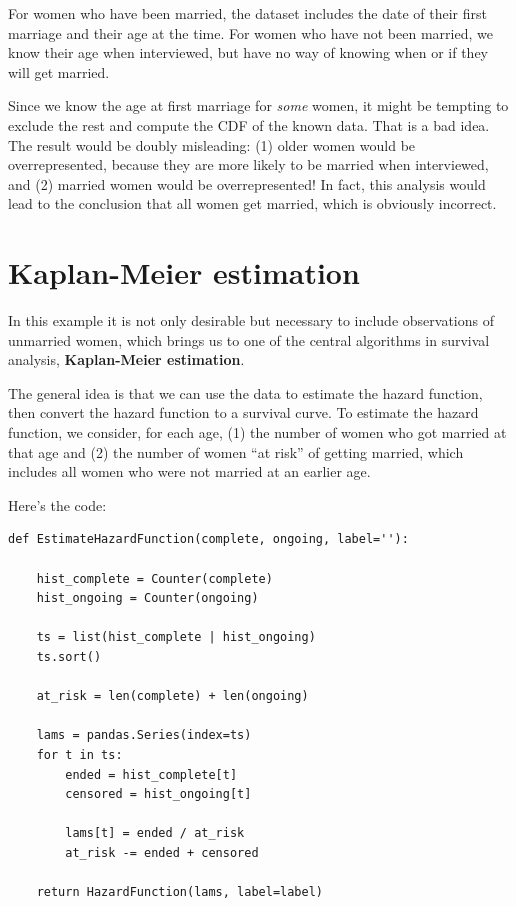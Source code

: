 \documentclass[12pt]{book}
\theoremstyle{exercise}
\begin{document}
For women who have been married, the dataset includes the date
of their first marriage and their age at the time.
For women who have not been married, we know their age when interviewed,
but have no way of knowing when or if they will get married.%

Since we know the age at first marriage for {\em some\/} women, it
might be tempting to exclude the rest and compute the CDF of
the known data.  That is a bad idea.  The result would
be doubly misleading: (1) older women would be overrepresented,
because they are more likely to be married when interviewed,
and (2) married women would be overrepresented!  In fact, this
analysis would lead to the conclusion that all women get married,
which is obviously incorrect.


\section{Kaplan-Meier estimation}

In this example it is not only desirable but necessary to include
observations of unmarried women, which brings us to one of the central
algorithms in survival analysis, {\bf Kaplan-Meier estimation}.%

The general idea is that we can use the data to estimate the hazard
function, then convert the hazard function to a survival curve.
To estimate the hazard function, we consider, for each age,
(1) the number of women who got married at that age and (2) the number
of women ``at risk'' of getting married, which includes all women
who were not married at an earlier age.%
%

Here's the code:

\begin{verbatim}
def EstimateHazardFunction(complete, ongoing, label=''):

    hist_complete = Counter(complete)
    hist_ongoing = Counter(ongoing)

    ts = list(hist_complete | hist_ongoing)
    ts.sort()

    at_risk = len(complete) + len(ongoing)

    lams = pandas.Series(index=ts)
    for t in ts:
        ended = hist_complete[t]
        censored = hist_ongoing[t]

        lams[t] = ended / at_risk
        at_risk -= ended + censored

    return HazardFunction(lams, label=label)
\end{verbatim}
\end{document}
